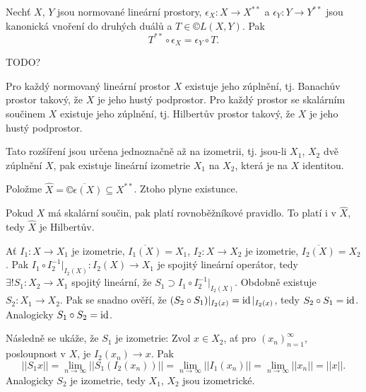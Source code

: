 \documentclass[12pt]{article}					%
\begin{document}
\begin{tvrzeni}[J. P. Schauder, 1930]
	Nechť $X$, $Y$ jsou normované lineární prostory, $\epsilon_X: X \rightarrow X^{**}$ a $\epsilon_Y: Y \rightarrow Y^{**}$ jsou kanonická vnoření do druhých duálů a $T \in ©L(X, Y)$. Pak
	$$ T^{**} \circ \epsilon_X = \epsilon_Y \circ T. $$


	\begin{dukazin}
		TODO?
	\end{dukazin}
\end{tvrzeni}

\begin{veta}
	Pro každý normovaný lineární prostor $X$ existuje jeho zúplnění, tj. Banachův prostor takový, že $X$ je jeho hustý podprostor. Pro každý prostor se skalárním součinem $X$ existuje jeho zúplnění, tj. Hilbertův prostor takový, že $X$ je jeho hustý podprostor.

	Tato rozšíření jsou určena jednoznačně až na izometrii, tj. jsou-li $X_1$, $X_2$ dvě zúplnění $X$, pak existuje lineární izometrie $X_1$ na $X_2$, která je na $X$ identitou.

	\begin{dukazin}
		Položme $\hat{X} = \overline{©\epsilon(X)} \subseteq X^{**}$. Ztoho plyne existunce.

		Pokud $X$ má skalární součin, pak platí rovnoběžníkové pravidlo. To platí i v $\hat{X}$, tedy $\hat{X}$ je Hilbertův.

		Ať $I_1: X \rightarrow X_1$ je izometrie, $\overline{I_1(X)} = X_1$, $I_2: X \rightarrow X_2$ je izometrie, $\overline{I_2(X)} = X_2$. Pak $I_1 \circ I_2^{-1}|_{I_2(X)}: I_2(X) \rightarrow X_1$ je spojitý lineární operátor, tedy $\exists! S_1: X_2 \rightarrow X_1$ spojitý lineární, že $S_1 \supset I_1 \circ I_2^{-1}|_{I_2(X)}$. Obdobně existuje $S_2: X_1 \rightarrow X_2$. Pak se snadno ověří, že $(S_2 \circ S_1)|_{I_2(x)} = \operatorname{id}|_{I_2(x)}$, tedy $S_2 \circ S_1 = \operatorname{id}$. Analogicky $S_1 \circ S_2 = \operatorname{id}$.

		Následně se ukáže, že $S_1$ je izometrie: Zvol $x \in X_2$, ať pro $(x_n)_{n=1}^∞$, posloupnost v $X$, je $I_2(x_n) \rightarrow x$. Pak
		$$ ||S_1 x|| = \lim_{n \rightarrow ∞}||S_1(I_2(x_n))|| = \lim_{n \rightarrow ∞} ||I_1(x_n)|| = \lim_{n \rightarrow ∞}||x_n|| = ||x||. $$
		Analogicky $S_2$ je izometrie, tedy $X_1$, $X_2$ jsou izometrické.
	\end{dukazin}

\end{veta}
	
\end{document}
